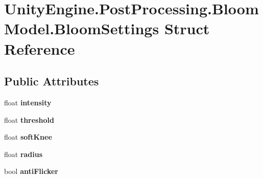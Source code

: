 \hypertarget{struct_unity_engine_1_1_post_processing_1_1_bloom_model_1_1_bloom_settings}{}\section{Unity\+Engine.\+Post\+Processing.\+Bloom\+Model.\+Bloom\+Settings Struct Reference}
\label{struct_unity_engine_1_1_post_processing_1_1_bloom_model_1_1_bloom_settings}
\subsection*{Public Attributes}
\begin{DoxyCompactItemize}
\item 
\mbox{\label{struct_unity_engine_1_1_post_processing_1_1_bloom_model_1_1_bloom_settings_a873b319dc2a9b7bbc33e34462fc7e8b1}} 
float {\bfseries intensity}
\item 
\mbox{\label{struct_unity_engine_1_1_post_processing_1_1_bloom_model_1_1_bloom_settings_a927bbdd918f3c48a278cf32e4d194ef1}} 
float {\bfseries threshold}
\item 
\mbox{\label{struct_unity_engine_1_1_post_processing_1_1_bloom_model_1_1_bloom_settings_a89cfb26e2f98e7729931da877b402074}} 
float {\bfseries soft\+Knee}
\item 
\mbox{\label{struct_unity_engine_1_1_post_processing_1_1_bloom_model_1_1_bloom_settings_a220aa76e152ad3c502f7f0af64371958}} 
float {\bfseries radius}
\item 
\mbox{\label{struct_unity_engine_1_1_post_processing_1_1_bloom_model_1_1_bloom_settings_ab1e432898f356ebf4794b7d1aac18c9c}} 
bool {\bfseries anti\+Flicker}
\end{DoxyCompactItemize}
